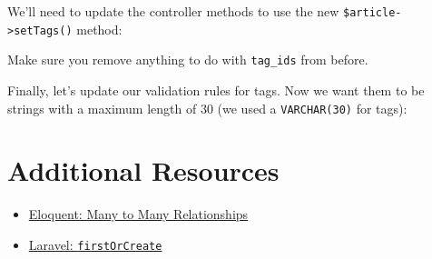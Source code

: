 \pagebreak

We'll need to update the controller methods to use the new \texttt{\$article->setTags()} method:


Make sure you remove anything to do with \texttt{tag\_ids} from before.

\pagebreak

Finally, let's update our validation rules for tags. Now we want them to be strings with a maximum length of 30 (we used a \texttt{VARCHAR(30)} for tags):




\section{Additional Resources}

\begin{itemize}[leftmargin=*]
    \item \href{http://laravel.com/docs/master/eloquent-relationships#many-to-many}{Eloquent: Many to Many Relationships}
    \item \href{http://laravel.com/docs/master/eloquent#other-creation-methods}{Laravel: \texttt{firstOrCreate}}
\end{itemize}
